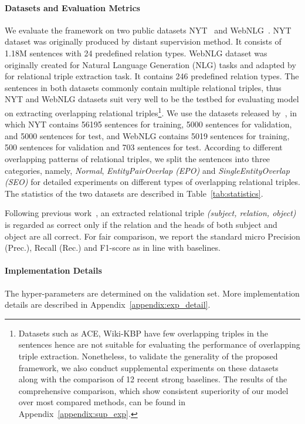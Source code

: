 \documentclass[11pt,a4paper]{article}
\begin{document}
\paragraph{Datasets and Evaluation Metrics}
We evaluate the framework on two public datasets NYT~\citep{riedel2010Modeling} and WebNLG~\citep{gardent2017Creating}. NYT dataset was originally produced by distant supervision method. It consists of 1.18M sentences with 24 predefined relation types. WebNLG dataset was originally created for Natural Language Generation (NLG) tasks and adapted by~\citep{zeng2018Extracting} for relational triple extraction task. It contains 246 predefined relation types. The sentences in both datasets commonly contain multiple relational triples, thus NYT and WebNLG datasets suit very well to be the testbed for evaluating model on extracting overlapping relational triples\footnote{Datasets such as ACE, Wiki-KBP have few overlapping triples in the sentences hence are not suitable for evaluating the performance of overlapping triple extraction. Nonetheless, to validate the generality of the proposed framework, we also conduct supplemental experiments on these datasets along with the comparison of 12 recent strong baselines. The results of the comprehensive comparison, which show consistent superiority of our model over most compared methods, can be found in Appendix~\ref{appendix:sup_exp}.}. We use the datasets released by~\citep{zeng2018Extracting}, in which NYT contains 56195 sentences for training, 5000 sentences for validation, and 5000 sentences for test, and WebNLG contains 5019 sentences for training, 500 sentences for validation and 703 sentences for test. According to different overlapping patterns of relational triples, we split the sentences into three categories, namely, \emph{Normal}, \emph{EntityPairOverlap (EPO)} and \emph{SingleEntityOverlap (SEO)} for detailed experiments on different types of overlapping relational triples. The statistics of the two datasets are described in Table~\ref{tab:statistics}.

\par Following previous work~\citep{fu2019GraphRel}, an extracted relational triple \emph{(subject, relation, object)} is regarded as correct only if the relation and the heads of both subject and object are all correct. For fair comparison, we report the standard micro Precision (Prec.), Recall (Rec.) and F1-score as in line with baselines.\label{exp:metric}

\paragraph{Implementation Details}
The hyper-parameters are determined on the validation set. More implementation details are described in Appendix~\ref{appendix:exp_detail}.
\end{document}
